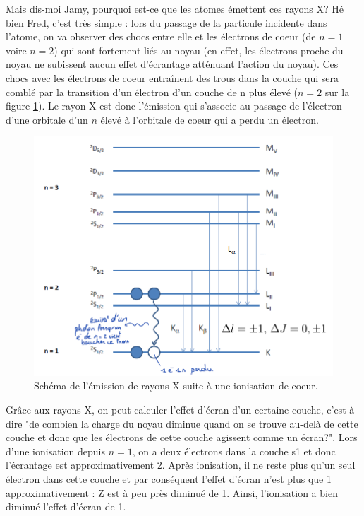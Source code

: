 Mais dis-moi Jamy, pourquoi est-ce que les atomes émettent ces rayons X? Hé bien Fred, c'est très simple : lors du passage de la particule incidente dans l'atome, on va observer des chocs entre elle et les électrons de coeur (de $n=1$ voire $n=2$) qui sont fortement liés au noyau (en effet, les électrons proche du noyau ne subissent aucun effet d'écrantage atténuant l'action du noyau). Ces chocs avec les électrons de coeur entraînent des trous dans la couche qui sera comblé par la transition d'un électron d'un couche de n plus élevé ($n=2$ sur la figure \ref{fig:Rayons X}). Le rayon X est donc l'émission qui s'associe au passage de l'électron d'une orbitale d'un $n$ élevé à l'orbitale de coeur qui a perdu un électron.
\begin{figure}[tph]
    \centering
    \includegraphics[scale=0.8]{Images2/Rayons X.PNG}
    \caption{Schéma de l'émission de rayons X suite à une ionisation de coeur.}
    \label{fig:Rayons X}
\end{figure}
Grâce aux rayons X, on peut calculer l'effet d'écran d'un certaine couche, c'est-à-dire "de combien la charge du noyau diminue quand on se trouve au-delà de cette couche et donc que les électrons de cette couche agissent comme un écran?". Lors d'une ionisation depuis $n=1$, on a deux électrons dans la couche s1 et donc l'écrantage est approximativement 2. Après ionisation, il ne reste plus qu'un seul électron dans cette couche et par conséquent l'effet d'écran n'est plus que 1 approximativement : Z est à peu près diminué de 1. Ainsi, l'ionisation a bien diminué l'effet d'écran de 1.\\
